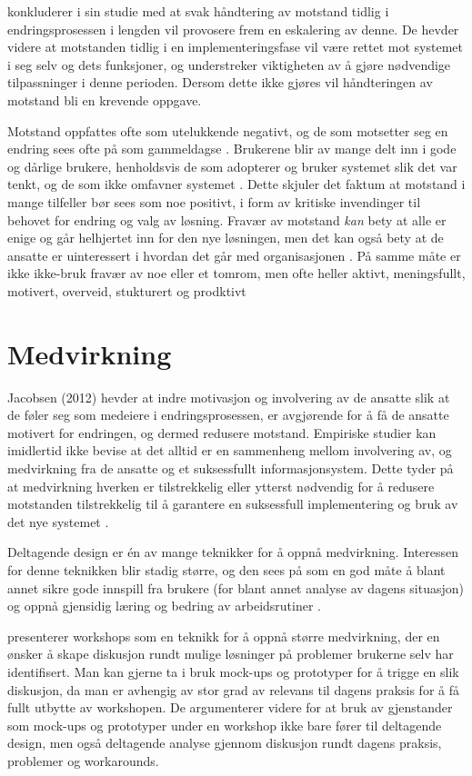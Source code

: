 \noindent
\citet{Lapointe05} konkluderer i sin studie med at svak håndtering av motstand tidlig i endringsprosessen i lengden vil provosere frem en eskalering av denne. De hevder videre at motstanden tidlig i en implementeringsfase vil være rettet mot systemet i seg selv og dets funksjoner, og understreker viktigheten av å gjøre nødvendige tilpassninger i denne perioden. Dersom dette ikke gjøres vil håndteringen av motstand bli en krevende oppgave.

\noindent
Motstand oppfattes ofte som utelukkende negativt, og de som motsetter seg en endring sees ofte på som gammeldagse \citep{Jacobsen12}. Brukerene blir av mange delt inn i gode og  dårlige brukere, henholdsvis de som adopterer og bruker systemet slik det var tenkt, og de som ikke omfavner systemet \citep{Satchell09}. Dette skjuler det faktum at motstand i mange tilfeller bør sees som noe positivt, i form av kritiske invendinger til behovet for endring og valg av løsning. Fravær av motstand \emph{kan} bety at alle er enige og går helhjertet inn for den nye løsningen, men det kan også bety at de ansatte er uinteressert i hvordan det går med organisasjonen \citep{Jacobsen12}. På samme måte er ikke ikke-bruk fravær av noe eller et tomrom, men ofte heller aktivt, meningsfullt, motivert, overveid, stukturert og prodktivt \citep{Satchell09}

\section{Medvirkning}
\label{sec:medvirkning}
Jacobsen (2012) hevder at indre motivasjon og involvering av de ansatte slik at de føler seg som medeiere i endringsprosessen, er avgjørende for å få de ansatte motivert for endringen, og dermed redusere motstand.
Empiriske studier kan imidlertid ikke bevise at det alltid er en sammenheng mellom involvering av, og medvirkning fra de ansatte og et suksessfullt informasjonsystem. Dette tyder på at medvirkning hverken er tilstrekkelig eller ytterst nødvendig for å redusere motstanden tilstrekkelig til å garantere en suksessfull implementering og bruk av det nye systemet \citep{Cavaye95}. 

\noindent
Deltagende design er én av mange teknikker for å oppnå medvirkning.
Interessen for denne teknikken blir stadig større, og den sees på som en god måte å blant annet sikre gode innspill fra brukere (for blant annet analyse av dagens situasjon) og oppnå gjensidig læring og bedring av arbeidsrutiner \citep{Mogensen92}.

\noindent
\citet{Mogensen92} presenterer workshops som en teknikk for å oppnå større medvirkning, der en ønsker å skape diskusjon rundt mulige løsninger på problemer brukerne selv har identifisert. Man kan gjerne ta i bruk mock-ups og prototyper for å trigge en slik diskusjon, da man er avhengig av stor grad av relevans til dagens praksis for å få fullt utbytte av workshopen. De argumenterer videre for at bruk av gjenstander som mock-ups og prototyper under en workshop ikke bare fører til deltagende design, men også deltagende analyse gjennom diskusjon rundt dagens praksis, problemer og workarounds.